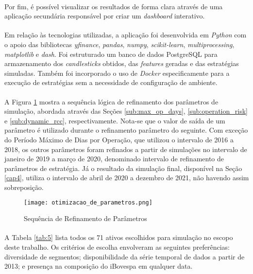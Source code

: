 \paragraph{} Por fim, é possível visualizar os resultados de forma clara através de uma aplicação secundária responsável por criar um \textit{dashboard} interativo.

\paragraph{} Em relação às tecnologias utilizadas, a aplicação foi desenvolvida em \textit{Python} com o apoio das bibliotecas \textit{yfinance}, \textit{pandas}, \textit{numpy}, \textit{scikit-learn}, \textit{multiprocessing}, \textit{matplotlib} e \textit{dash}. Foi estruturado um banco de dados PostgreSQL para armazenamento dos \textit{candlesticks} obtidos, das \textit{features} geradas e das estratégias simuladas. Também foi incorporado o uso de \textit{Docker} especificamente para a execução de estratégias sem a necessidade de configuração de ambiente.

\paragraph{} A Figura \ref{fig:444} mostra a sequência lógica de refinamento dos parâmetros de simulação, abordada através das Seções \ref{sub:max_op_days}, \ref{sub:operation_risk} e \ref{sub:dynamic_rcc}, respectivamente. Nota-se que o valor de saída de um parâmetro é utilizado durante o refinamento parâmetro do seguinte. Com exceção do Período Máximo de Dias por Operação, que utilizou o intervalo de 2016 a 2018, os outros parâmetros foram refinados a partir de simulações no intervalo de janeiro de 2019 a março de 2020, denominado intervalo de refinamento de parâmetros de estratégia. Já o resultado da simulação final, disponível na Seção \ref{cap4}, utiliza o intervalo de abril de 2020 a dezembro de 2021, não havendo assim sobreposição.

\begin{figure}[!htb]
    \texttt{[image: otimizacao\_de\_parametros.png]}
    \centering
    \caption{Sequência de Refinamento de Parâmetros}
    \label{fig:444}
\end{figure}

\paragraph{} A Tabela \ref{tab:5} lista todos os 71 ativos escolhidos para simulação no escopo deste trabalho. Os critérios de escolha envolveram as seguintes preferências: diversidade de segmentos; disponibilidade da série temporal de dados a partir de 2013; e presença na composição do iBovespa em qualquer data.

